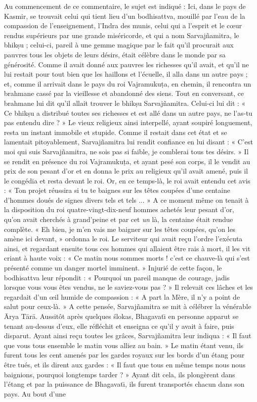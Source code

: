 \documentclass[a4paper, 11pt, oneside, french, landscape, twocolumn]{article}
\begin{document}
Au commencement de ce commentaire, le sujet est indiqué : Ici, dans le pays de Kasmir, se trouvait celui qui tient lieu d'un bodhisattva, mouillé par l'eau de la compassion de l'enseignement, l'Indra des munis, celui qui a l'esprit et le cœur rendus supérieurs par une grande miséricorde, et qui a nom Sarvaj\~{n}amitra, le bhik\d{s}u ; celui-ci, pareil à une gemme magique par le fait qu'il procurait aux pauvres tous les objets de leurs désirs, était célèbre dans le monde par sa générosité. Comme il avait donné aux pauvres les richesses qu'il avait, et qu'il ne lui restait pour tout bien que les haillons et l'écuelle, il alla dans un autre pays ; et, comme il arrivait dans le pays du roi Vajramuku\d{t}a, en chemin, il rencontra un brahmane cassé par la vieillesse et abandonné des siens. Tout en conversant, ce brahmane lui dit qu'il allait trouver le bhik\d{s}u Sarvaj\~{n}amitra. Celui-ci lui dit : « Ce bhik\d{s}u a distribué toutes ses richesses et est allé dans un autre pays, ne l'as-tu pas entendu dire ? » Le vieux religieux ainsi interpellé, ayant soupiré longuement, resta un instant immobile et stupide. Comme il restait dans cet état et se lamentait pitoyablement, Sarvaj\~{n}amitra lui rendit confiance en lui disant : « C'est moi qui suis Sarvaj\~{n}amitra, ne sois pas si faible, je comblerai tous tes désirs. » Il se rendit en présence du roi Vajramuku\d{t}a, et ayant pesé son corps, il le vendit au prix de son pesant d'or et en donna le prix au religieux qu'il avait amené, puis il le congédia et resta devant le roi. Or, en ce temps-là, le roi avait entendu cet avis : « Ton projet réussira si tu te baignes sur les têtes coupées d'une centaine d'hommes doués de signes divers tels et tels ... » A ce moment même on tenait à la disposition du roi quatre-vingt-dix-neuf hommes achetés leur pesant d'or, qu'on avait cherchés à grand'peine et par cet \emph{un} là, la centaine était rendue complète. « Eh bien, je m'en vais me baigner sur les têtes coupées, qu'on les amène ici devant, » ordonna le roi. Le serviteur qui avait reçu l'ordre l'exécuta ainsi, et regardant ensuite tous ces hommes qui allaient être rais à mort, il les vit criant à haute voix : « Ce matin nous sommes morts ! c'est ce chauve-là qui s'est présenté comme un danger mortel imminent. » Injurié de cette façon, le bodhisattva leur répondit : « Pourquoi un pareil manque de courage, jadis lorsque vous vous êtes vendus, ne le saviez-vous pas ? » Il relevait ces lâches et les regardait d'un œil humide de compassion : « A part la Mère, il n'y a point de salut pour ceux-là. » A cette pensée, Sarvaj\~{n}amitra se mit à célébrer la vénérable \={A}rya T\={a}r\={a}. Aussitôt après quelques \'{s}lokas, Bhagavat\={\i} en personne apparut se tenant au-dessus d'eux, elle réfléchit et enseigna ce qu'il y avait à faire, puis disparut. Ayant ainsi reçu toutes les grâces, Sarvaj\~{n}amitra leur indiqua : « Il faut que vous tous ensemble le matin vous alliez au bain. » Le matin étant venu, ils furent tous les cent amenés par les gardes royaux sur les bords d'un étang pour être tués, et ils dirent aux gardes : « Il faut que tous en même temps nous nous baignions, pourquoi longtemps tarder ? » Ayant dit cela, ils plongèrent dans l'étang et par la puissance de Bhagavat\={\i}, ils furent transportés chacun dans son pays. Au bout d'une 
\end{document}
